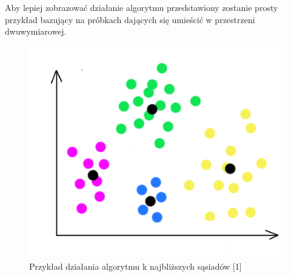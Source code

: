 \documentclass[12pt]{article}
\begin{document}
Aby lepiej zobrazować działanie algorytmu przedstawiony zostanie prosty przykład bazujący na próbkach dających się umieścić w przestrzeni dwuwymiarowej. \newline
\begin{figure}[H]
	\centering
		\includegraphics[scale=0.7]{images/nm_alg_example.png}
	\caption{Przykład działania algorytmu k najbliższych sąsiadów [1]}
\end{figure}
\end{document}
